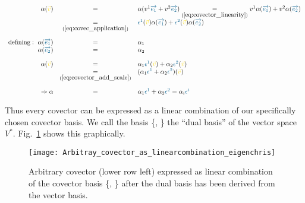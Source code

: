 \begin{equation}
    \label{eq:covector_with_respect_to_old_basis} 
    \begin{array}{rcl}
        \alpha(\hdv) & = &
        \alpha(\hdvc{1}\hdbv{1} + \hdvc{2}\hdbv{2})
        \underset{(\ref{eq:covector_linearity})}{=}
        \hdvc{1}\alpha(\hdbv{1}) + \hdvc{2}\alpha(\hdbv{2}) \\
        & \underset{(\ref{eq:covec_application})}{=} &
        \hdcbvc{1}(\hdv)\alpha(\hdbv{1}) + \hdcbvc{2}(\hdv)\alpha(\hdbv{2}) \\
        \noalign{\vskip10pt}
        \text{defining}:\ \alpha(\hdbv{1}) & = & \alpha_1 \\
        \alpha(\hdbv{2}) & = & \alpha_2\\ 
        \noalign{\vskip10pt}
        \alpha(\hdv) & = &
        \alpha_1\hdcbvc{1}(\hdv) + \alpha_2\hdcbvc{2}(\hdv) \\
        & \underset{(\ref{eq:covector_add_scale})}{=} &
        (\alpha_1\hdcbvc{1} + \alpha_2\hdcbvc{2})(\hdv) \\
        \noalign{\vskip10pt}
        \Rightarrow \alpha & = & \alpha_1\hdcbvc{1} + \alpha_2\hdcbvc{2}
        = \alpha_i \hdcbvc{i}
    \end{array}
\end{equation}

Thus every covector can be expressed as a linear combination of our specifically chosen
covector basis. We call the basis \{, \} the ``dual basis'' of the vector
space $V^*$. Fig.~\ref{fig:arbitrary_covector_linearcombination} shows this graphically.\\

\begin{figure}[h]
    \centering
    \texttt{[image: Arbitray\_covector\_as\_linearcombination\_eigenchris]}
    \caption{Arbitrary covector (lower row left) expressed as linear combination of the
    covector basis \{, \} after the dual basis has been derived from
    the vector basis.}
    \label{fig:arbitrary_covector_linearcombination}
\end{figure}

